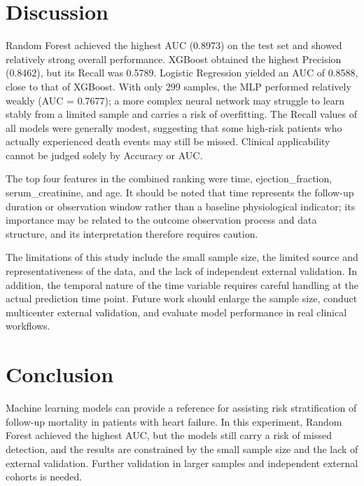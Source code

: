 \documentclass[a4paper,12pt]{article}
\begin{document}
\section{Discussion}
Random Forest achieved the highest AUC (0.8973) on the test set and showed relatively strong overall performance. XGBoost obtained the highest Precision (0.8462), but its Recall was 0.5789. Logistic Regression yielded an AUC of 0.8588, close to that of XGBoost. With only 299 samples, the MLP performed relatively weakly (AUC = 0.7677); a more complex neural network may struggle to learn stably from a limited sample and carries a risk of overfitting. The Recall values of all models were generally modest, suggesting that some high-risk patients who actually experienced death events may still be missed. Clinical applicability cannot be judged solely by Accuracy or AUC.

The top four features in the combined ranking were time, ejection\_fraction, serum\_creatinine, and age. It should be noted that time represents the follow-up duration or observation window rather than a baseline physiological indicator; its importance may be related to the outcome observation process and data structure, and its interpretation therefore requires caution.

The limitations of this study include the small sample size, the limited source and representativeness of the data, and the lack of independent external validation. In addition, the temporal nature of the time variable requires careful handling at the actual prediction time point. Future work should enlarge the sample size, conduct multicenter external validation, and evaluate model performance in real clinical workflows.

\section{Conclusion}
Machine learning models can provide a reference for assisting risk stratification of follow-up mortality in patients with heart failure. In this experiment, Random Forest achieved the highest AUC, but the models still carry a risk of missed detection, and the results are constrained by the small sample size and the lack of external validation. Further validation in larger samples and independent external cohorts is needed.
\end{document}
